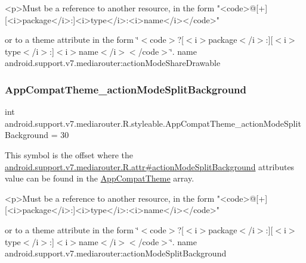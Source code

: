 \begin{DoxyVerb}      <p>Must be a reference to another resource, in the form "<code>@[+][<i>package</i>:]<i>type</i>:<i>name</i></code>"
\end{DoxyVerb}
 or to a theme attribute in the form \char`\"{}$<$code$>$?\mbox{[}$<$i$>$package$<$/i$>$\+:\mbox{]}\mbox{[}$<$i$>$type$<$/i$>$\+:\mbox{]}$<$i$>$name$<$/i$>$$<$/code$>$\char`\"{}.  name android.\+support.\+v7.\+mediarouter\+:action\+Mode\+Share\+Drawable \mbox{\label{classandroid_1_1support_1_1v7_1_1mediarouter_1_1R_1_1styleable_abc934a2d6ba38ecd031b953990596657}} 
\subsubsection{\texorpdfstring{App\+Compat\+Theme\+\_\+action\+Mode\+Split\+Background}{AppCompatTheme\_actionModeSplitBackground}}
{\footnotesize\ttfamily int android.\+support.\+v7.\+mediarouter.\+R.\+styleable.\+App\+Compat\+Theme\+\_\+action\+Mode\+Split\+Background = 30\hspace{0.3cm}{\ttfamily [static]}}

This symbol is the offset where the \hyperlink{classandroid_1_1support_1_1v7_1_1mediarouter_1_1R_1_1attr_adaf4fdcaeacbae5e63cbca33cc21ceb8}{android.\+support.\+v7.\+mediarouter.\+R.\+attr\#action\+Mode\+Split\+Background} attribute\textquotesingle{}s value can be found in the \hyperlink{classandroid_1_1support_1_1v7_1_1mediarouter_1_1R_1_1styleable_a4e3d3900c75d49aeb2f283cac00214d6}{App\+Compat\+Theme} array.

\begin{DoxyVerb}      <p>Must be a reference to another resource, in the form "<code>@[+][<i>package</i>:]<i>type</i>:<i>name</i></code>"
\end{DoxyVerb}
 or to a theme attribute in the form \char`\"{}$<$code$>$?\mbox{[}$<$i$>$package$<$/i$>$\+:\mbox{]}\mbox{[}$<$i$>$type$<$/i$>$\+:\mbox{]}$<$i$>$name$<$/i$>$$<$/code$>$\char`\"{}.  name android.\+support.\+v7.\+mediarouter\+:action\+Mode\+Split\+Background \mbox{\label{classandroid_1_1support_1_1v7_1_1mediarouter_1_1R_1_1styleable_aa2e34e25fe2d921d8ba076badd8da157}} 
